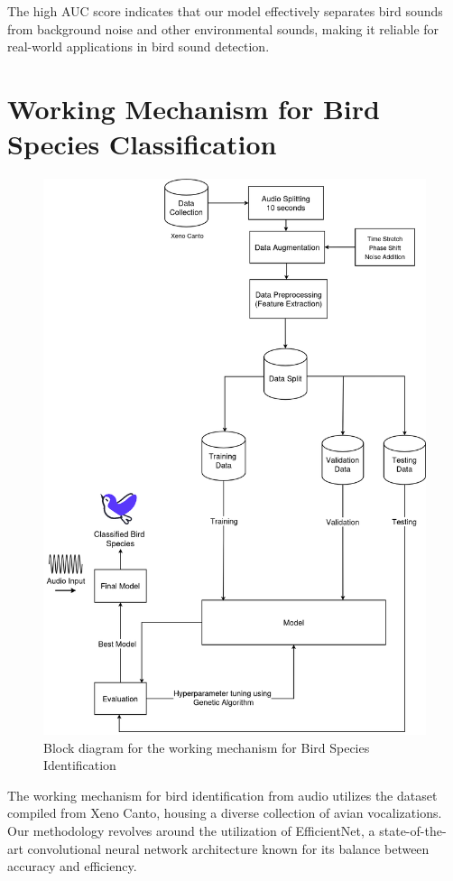       The high AUC score indicates that our model effectively separates bird sounds from background noise and other environmental sounds, making it reliable for real-world applications in bird sound detection.



\newpage
\section{Working Mechanism for Bird Species Classification}
       \begin{figure}[h!]
            \centering
            \includegraphics[scale=0.33]{images/MajorProject-Audio Methodology.png}
            \caption{Block diagram for the working mechanism for Bird Species Identification}%
        \end{figure}
        The working mechanism for bird identification from audio utilizes the dataset
        compiled from Xeno Canto, housing a diverse collection of avian vocalizations.
        Our methodology revolves around the utilization of EfficientNet, a
        state-of-the-art convolutional neural network architecture known for its
        balance between accuracy and efficiency.

